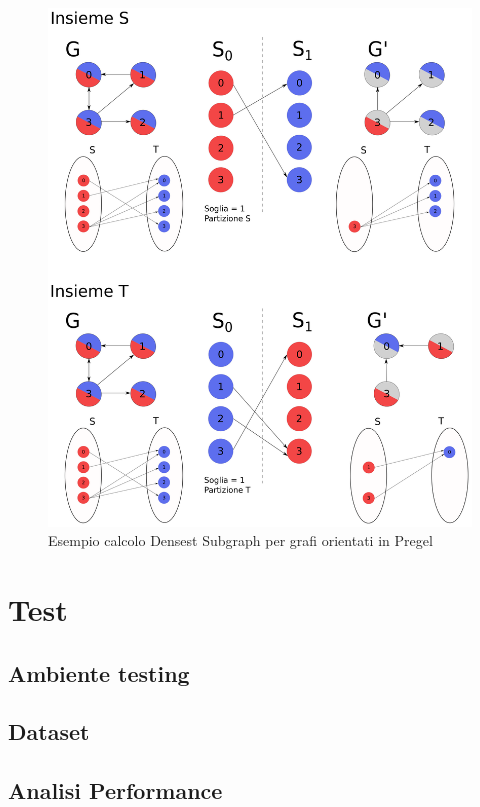 \documentclass[LaM,binding=0.6cm]{sapthesis}
\begin{document}
\begin{figure}

\centering
 \includegraphics[width=1\textwidth]{PREGEL-denesestD}
\caption{Esempio calcolo Densest Subgraph per grafi orientati in Pregel}
\label{fig:PREGELDENSESESTD}
\end{figure}

\chapter{Test}

\section{Ambiente testing}

\section{Dataset}

\section{Analisi Performance}
\end{document}
